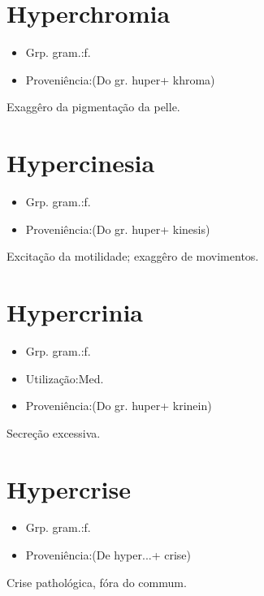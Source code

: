 \documentclass{article}
\begin{document}
\section{Hyperchromia}
\begin{itemize}
\item {Grp. gram.:f.}
\end{itemize}
\begin{itemize}
\item {Proveniência:(Do gr. \textunderscore huper\textunderscore  + \textunderscore khroma\textunderscore )}
\end{itemize}
Exaggêro da pigmentação da pelle.
\section{Hypercinesia}
\begin{itemize}
\item {Grp. gram.:f.}
\end{itemize}
\begin{itemize}
\item {Proveniência:(Do gr. \textunderscore huper\textunderscore  + \textunderscore kinesis\textunderscore )}
\end{itemize}
Excitação da motilidade; exaggêro de movimentos.
\section{Hypercrinia}
\begin{itemize}
\item {Grp. gram.:f.}
\end{itemize}
\begin{itemize}
\item {Utilização:Med.}
\end{itemize}
\begin{itemize}
\item {Proveniência:(Do gr. \textunderscore huper\textunderscore  + \textunderscore krinein\textunderscore )}
\end{itemize}
Secreção excessiva.
\section{Hypercrise}
\begin{itemize}
\item {Grp. gram.:f.}
\end{itemize}
\begin{itemize}
\item {Proveniência:(De \textunderscore hyper...\textunderscore  + \textunderscore crise\textunderscore )}
\end{itemize}
Crise pathológica, fóra do commum.
\end{document}
